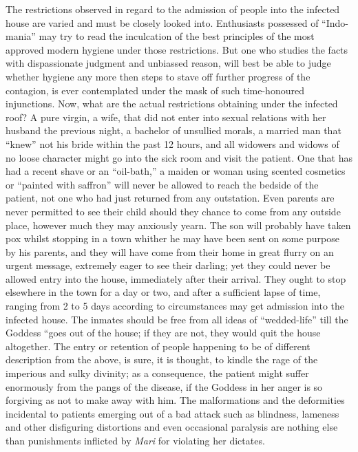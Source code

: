 \documentclass[a4paper, 12pt, oneside, english]{article}
\begin{document}
The restrictions observed in regard to the admission of people into the infected house are varied and must be closely looked into. Enthusiasts possessed of ``Indo-mania'' may try to read the inculcation of the best principles of the most approved modern hygiene under those restrictions. But one who studies the facts with dispassionate judgment and unbiassed reason, will best be able to judge whether hygiene any more then steps to stave off further progress of the contagion, is ever contemplated under the mask of such time-honoured injunctions. Now, what are the actual restrictions obtaining under the infected roof? A pure virgin, a wife, that did not enter into sexual relations with her husband the previous night, a bachelor of unsullied morals, a married man that ``knew'' not his bride within the past 12 hours, and all widowers and widows of no loose character might go into the sick room and visit the patient. One that has had a recent shave or an ``oil-bath,'' a maiden or woman using scented cosmetics or ``painted with saffron'' will never be allowed to reach the bedside of the patient, not one who had just returned from any outstation. Even parents are never permitted to see their child should they chance to come from any outside place, however much they may anxiously yearn. The son will probably have taken pox whilst stopping in a town whither he may have been sent on some purpose by his parents, and they will have come from their home in great flurry on an urgent message, extremely eager to see their darling; yet they could never be allowed entry into the house, immediately after their arrival. They ought to stop elsewhere in the town for a day or two, and after a sufficient lapse of time, ranging from 2 to 5 days according to circumstances may get admission into the infected house. The inmates should be free from all ideas of ``wedded-life'' till the Goddess ``goes out of the house; if they are not, they would quit the house altogether. The entry or retention of people happening to be of different description from the above, is sure, it is thought, to kindle the rage of the imperious and sulky divinity; as a consequence, the patient might suffer enormously from the pangs of the disease, if the Goddess in her anger is so forgiving as not to make away with him. The malformations and the deformities incidental to patients emerging out of a bad attack such as blindness, lameness and other disfiguring distortions and even occasional paralysis are nothing else than punishments inflicted by \emph{Mari} for violating her dictates.
\end{document}
